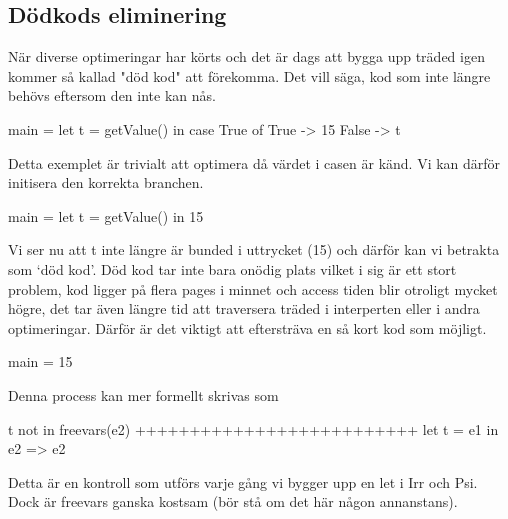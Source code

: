 \documentclass[../Optimise]{subfiles}
\begin{document}
\subsection{Dödkods eliminering}


När diverse optimeringar har körts och det är dags att bygga upp träded igen kommer
så kallad "död kod" att förekomma. Det vill säga, kod som inte längre behövs eftersom
den inte kan nås.

\begin{codeEx}
main = let t = getValue() in
            case True of
               True  -> 15
               False -> t
\end{codeEx}

Detta exemplet är trivialt att optimera då värdet i casen är känd. Vi kan därför
initisera den korrekta branchen.


\begin{codeEx}
main = let t = getValue() in 15
\end{codeEx}


Vi ser nu att t inte längre är bunded i uttrycket (15) och därför kan vi
 betrakta  som `död kod'. Död kod tar inte bara onödig plats
 vilket i sig är ett stort problem, kod ligger på flera pages i minnet och
 access tiden blir otroligt mycket högre, det tar även längre tid att traversera
 träded i interperten eller i andra optimeringar. Därför är det viktigt att
 eftersträva en så kort kod som möjligt.

\begin{codeEx}
main = 15
\end{codeEx}

Denna process kan mer formellt skrivas som

\begin{codeEx}
t not in freevars(e2)
++++++++++++++++++++++++++
let t = e1 in e2 => e2
\end{codeEx}

Detta är en kontroll som utförs varje gång vi bygger upp en let i Irr och Psi.
Dock är freevars ganska kostsam (bör stå om det här någon annanstans).
\end{document}
